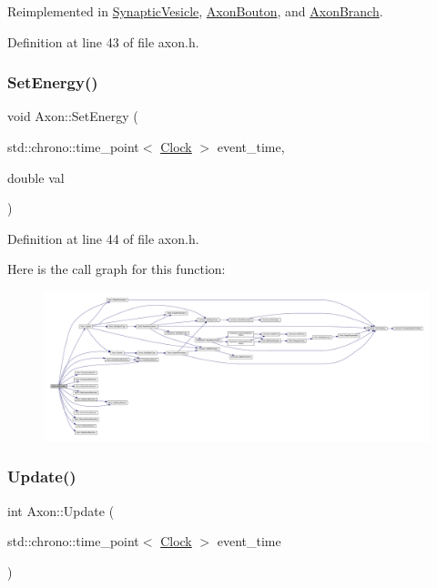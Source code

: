 Reimplemented in \hyperlink{class_synaptic_vesicle_a7fd7cfce5eccb904206d968866f85220}{Synaptic\+Vesicle}, \hyperlink{class_axon_bouton_afe285478d414f2815afb98abe7b92898}{Axon\+Bouton}, and \hyperlink{class_axon_branch_a96ba30b18627563d637d4e02fac943be}{Axon\+Branch}.



Definition at line 43 of file axon.\+h.

\mbox{\label{class_axon_af5108f451de97deb56138e8e81ced359}} 
\subsubsection{\texorpdfstring{Set\+Energy()}{SetEnergy()}}
{\footnotesize\ttfamily void Axon\+::\+Set\+Energy (\begin{DoxyParamCaption}\item[{std\+::chrono\+::time\+\_\+point$<$ \hyperlink{universe_8h_a0ef8d951d1ca5ab3cfaf7ab4c7a6fd80}{Clock} $>$}]{event\+\_\+time,  }\item[{double}]{val }\end{DoxyParamCaption})\hspace{0.3cm}{\ttfamily [inline]}}



Definition at line 44 of file axon.\+h.

Here is the call graph for this function\+:
\nopagebreak
\begin{figure}[H]
\begin{center}
\leavevmode
\includegraphics[width=350pt]{class_axon_af5108f451de97deb56138e8e81ced359_cgraph}
\end{center}
\end{figure}
\mbox{\label{class_axon_a472ee760a1727072afaff0035d1eedd9}} 
\subsubsection{\texorpdfstring{Update()}{Update()}}
{\footnotesize\ttfamily int Axon\+::\+Update (\begin{DoxyParamCaption}\item[{std\+::chrono\+::time\+\_\+point$<$ \hyperlink{universe_8h_a0ef8d951d1ca5ab3cfaf7ab4c7a6fd80}{Clock} $>$}]{event\+\_\+time }\end{DoxyParamCaption})}



